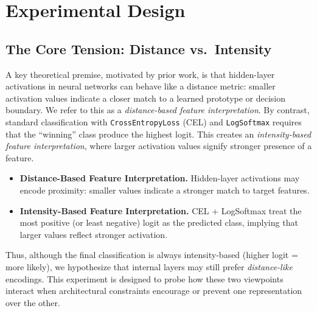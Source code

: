 \section{Experimental Design}
\label{sec:exp_design}

\subsection{The Core Tension: Distance vs.\ Intensity}
A key theoretical premise, motivated by prior work, is that hidden-layer activations in neural networks can behave like a distance metric: smaller activation values indicate a closer match to a learned prototype or decision boundary. We refer to this as a \emph{distance-based feature interpretation}. By contrast, standard classification with \texttt{CrossEntropyLoss} (CEL) and \texttt{LogSoftmax} requires that the ``winning'' class produce the highest logit. This creates an \emph{intensity-based feature interpretation}, where larger activation values signify stronger presence of a feature.

\begin{itemize}
    \item \textbf{Distance-Based Feature Interpretation.} Hidden-layer activations may encode proximity: smaller values indicate a stronger match to target features.
    \item \textbf{Intensity-Based Feature Interpretation.} CEL + LogSoftmax treat the most positive (or least negative) logit as the predicted class, implying that larger values reflect stronger activation.
\end{itemize}

Thus, although the final classification is always intensity-based (higher logit = more likely), we hypothesize that internal layers may still prefer \emph{distance-like} encodings. This experiment is designed to probe how these two viewpoints interact when architectural constraints encourage or prevent one representation over the other.

